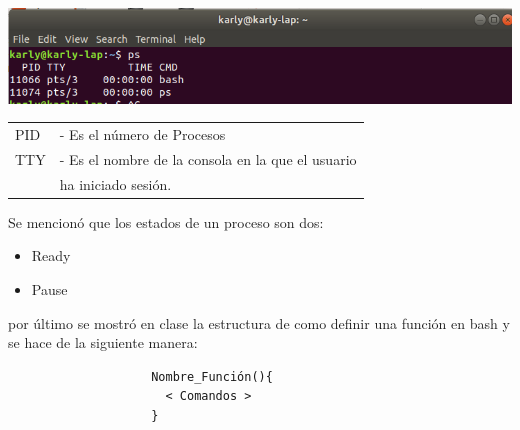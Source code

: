 \documentclass[a4paper, 11pt, oneside]{article}
\begin{document}
\begin{center}
 \includegraphics[scale=0.30]{1.png}
\end{center}

\begin{tabular}{ll}
PID &- Es el número de Procesos\\
TTY &- Es el nombre de la consola en la que el usuario\\ &ha iniciado sesión.
\end{tabular}

Se mencionó que los estados de un proceso son dos:
\begin{itemize}
 \item Ready
 \item Pause
\end{itemize}

por último se mostró en clase la estructura de como definir una función en bash y se hace de la siguiente manera:
\begin{verbatim}
                    Nombre_Función(){
                      < Comandos >
                    }
\end{verbatim}
\end{document}

